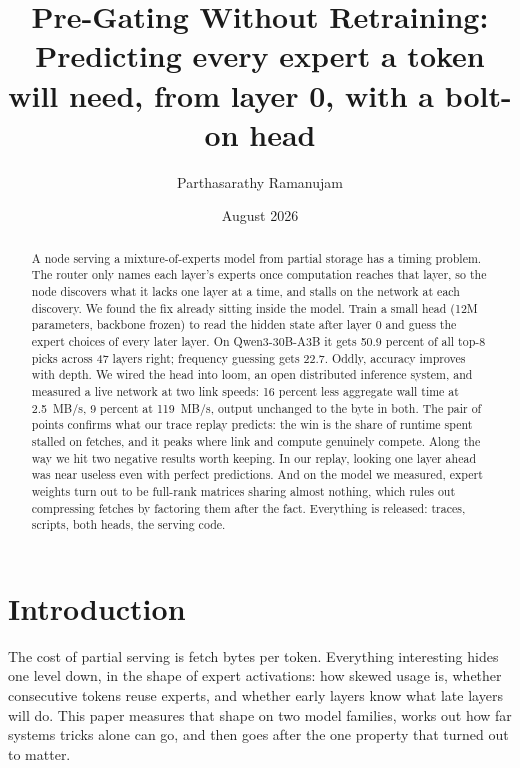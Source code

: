\documentclass[11pt]{article}
\title{Pre-Gating Without Retraining:\\ \large Predicting every expert a token will need, from layer 0, with a bolt-on head}
\author{Parthasarathy Ramanujam}
\date{August 2026}
\begin{document}
\maketitle

\begin{abstract}
A node serving a mixture-of-experts model from partial storage has a timing problem. The router only names each layer's experts once computation reaches that layer, so the node discovers what it lacks one layer at a time, and stalls on the network at each discovery. We found the fix already sitting inside the model. Train a small head (12M parameters, backbone frozen) to read the hidden state after layer 0 and guess the expert choices of every later layer. On Qwen3-30B-A3B it gets 50.9 percent of all top-8 picks across 47 layers right; frequency guessing gets 22.7. Oddly, accuracy improves with depth. We wired the head into loom, an open distributed inference system, and measured a live network at two link speeds: 16 percent less aggregate wall time at 2.5~MB/s, 9 percent at 119~MB/s, output unchanged to the byte in both. The pair of points confirms what our trace replay predicts: the win is the share of runtime spent stalled on fetches, and it peaks where link and compute genuinely compete. Along the way we hit two negative results worth keeping. In our replay, looking one layer ahead was near useless even with perfect predictions. And on the model we measured, expert weights turn out to be full-rank matrices sharing almost nothing, which rules out compressing fetches by factoring them after the fact. Everything is released: traces, scripts, both heads, the serving code.
\end{abstract}

\section{Introduction}
The cost of partial serving is fetch bytes per token. Everything interesting hides one level down, in the shape of expert activations: how skewed usage is, whether consecutive tokens reuse experts, and whether early layers know what late layers will do. This paper measures that shape on two model families, works out how far systems tricks alone can go, and then goes after the one property that turned out to matter.
\end{document}
